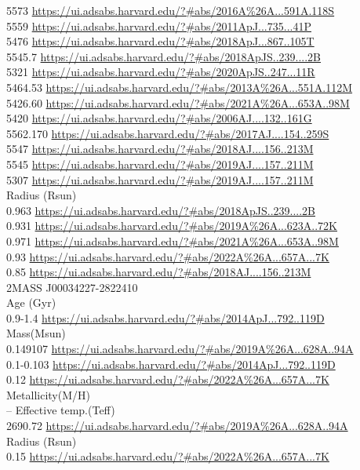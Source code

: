 5573 \url{https://ui.adsabs.harvard.edu/?#abs/2016A%26A...591A.118S}\\
5559 \url{https://ui.adsabs.harvard.edu/?#abs/2011ApJ...735...41P}\\
5476 \url{https://ui.adsabs.harvard.edu/?#abs/2018ApJ...867..105T}\\
5545.7 \url{https://ui.adsabs.harvard.edu/?#abs/2018ApJS..239....2B}\\
5321 \url{https://ui.adsabs.harvard.edu/?#abs/2020ApJS..247...11R}\\
5464.53 \url{https://ui.adsabs.harvard.edu/?#abs/2013A%26A...551A.112M}\\
5426.60	\url{https://ui.adsabs.harvard.edu/?#abs/2021A%26A...653A..98M}\\
5420 \url{https://ui.adsabs.harvard.edu/?#abs/2006AJ....132..161G}\\
5562.170 \url{https://ui.adsabs.harvard.edu/?#abs/2017AJ....154..259S}\\
5547 \url{https://ui.adsabs.harvard.edu/?#abs/2018AJ....156..213M}\\
5545 \url{https://ui.adsabs.harvard.edu/?#abs/2019AJ....157..211M}\\
5307 \url{https://ui.adsabs.harvard.edu/?#abs/2019AJ....157..211M}\\
Radius (Rsun)\\
0.963 \url{https://ui.adsabs.harvard.edu/?#abs/2018ApJS..239....2B}\\
0.931 \url{https://ui.adsabs.harvard.edu/?#abs/2019A%26A...623A..72K}\\
0.971 \url{https://ui.adsabs.harvard.edu/?#abs/2021A%26A...653A..98M}\\
0.93 \url{https://ui.adsabs.harvard.edu/?#abs/2022A%26A...657A...7K}\\
0.85 \url{https://ui.adsabs.harvard.edu/?#abs/2018AJ....156..213M}\\

2MASS J00034227-2822410\\
Age (Gyr)\\
0.9-1.4 \url{https://ui.adsabs.harvard.edu/?#abs/2014ApJ...792..119D}\\
Mass(Msun)\\
0.149107 \url{https://ui.adsabs.harvard.edu/?#abs/2019A%26A...628A..94A}\\
0.1-0.103 \url{https://ui.adsabs.harvard.edu/?#abs/2014ApJ...792..119D}\\
0.12 \url{https://ui.adsabs.harvard.edu/?#abs/2022A%26A...657A...7K}\\
Metallicity(M/H)\\
--
Effective temp.(Teff)\\
2690.72	\url{https://ui.adsabs.harvard.edu/?#abs/2019A%26A...628A..94A}\\
Radius (Rsun)\\
0.15 \url{https://ui.adsabs.harvard.edu/?#abs/2022A%26A...657A...7K}\\


